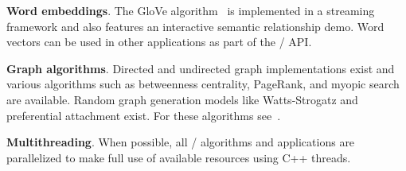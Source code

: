 \textbf{Word embeddings}.
The GloVe algorithm~\cite{glove} is implemented in a streaming framework and
also features an interactive semantic relationship demo. Word vectors can be
used in other applications as part of the \meta/ API\@.

\textbf{Graph algorithms}.
Directed and undirected graph implementations exist and various algorithms such
as betweenness centrality, PageRank, and myopic search are available. Random
graph generation models like Watts-Strogatz and preferential attachment exist.
For these algorithms see~\cite{networks}.

\textbf{Multithreading}.
When possible, all \meta/ algorithms and applications are parallelized to make
full use of available resources using C++ threads.
